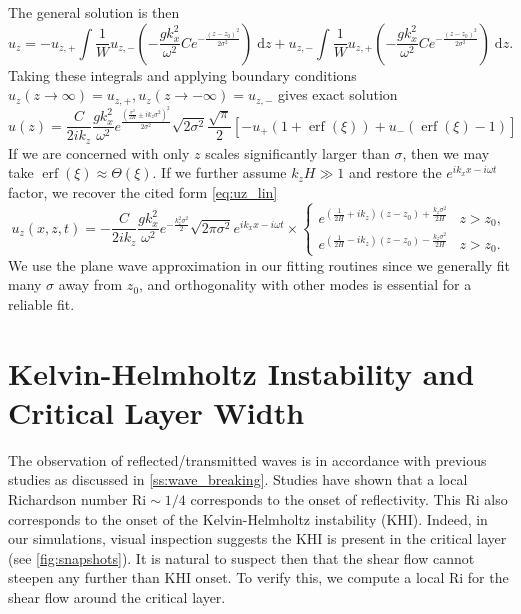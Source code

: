 \documentclass[
        fleqn,
        usenatbib,
        referee,
    ]{mnras}
\newcommand*{\p}[1]{\left(#1\right)}
\newcommand*{\s}[1]{\left[#1\right]}
\DeclareMathOperator*{\erf}{erf}
\begin{document}
The general solution is then
\begin{equation}
    u_z = -u_{z,+}\int \frac{1}{W} u_{z,-} \p{-\frac{gk_x^2}{\omega^2}
            Ce^{-\frac{(z - z_0)^2}{2\sigma^2}}}\;\mathrm{d}z
        + u_{z,-}\int \frac{1}{W} u_{z,+} \p{-\frac{gk_x^2}{\omega^2}
            Ce^{-\frac{(z - z_0)^2}{2\sigma^2}}}\;\mathrm{d}z.
\end{equation}
Taking these integrals and applying boundary conditions $u_z\p{z \to \infty} =
u_{z,+}, u_z\p{z \to -\infty} = u_{z,-}$ gives exact solution
\begin{equation}
    u(z) = \frac{C}{2ik_z}\frac{gk_x^2}{\omega^2}
            e^{\frac{\p{\frac{\sigma^2}{2H} \pm ik_z\sigma^2}^2}{2\sigma^2}}
                \sqrt{2\sigma^2} \frac{\sqrt{\pi}}{2}\s{
                    -u_+\p{1 + \erf\p{\xi}}
                    + u_- \p{\erf\p{\xi} - 1}}
\end{equation}
If we are concerned with only $z$ scales significantly larger than $\sigma$,
then we may take $\erf(\xi) \approx \Theta(\xi)$. If we further assume $k_zH \gg
1$ and restore the $e^{ik_xx - i\omega t}$ factor, we recover the cited form
\autoref{eq:uz_lin}
\begin{equation}
    u_{z}(x, z, t) = -\frac{C}{2ik_z}\frac{gk_x^2}{\omega^2}
        e^{-\frac{k_z^2\sigma^2}{2}}
        \sqrt{2\pi \sigma^2} e^{ik_xx - i\omega t} \times
    \begin{cases}
        e^{\p{\frac{1}{2H} + ik_z}\p{z - z_0} + \frac{k_z\sigma^2}{2H}}
            & z > z_0,\\
        e^{\p{\frac{1}{2H} - ik_z}\p{z - z_0} - \frac{k_z\sigma^2}{2H}}
            & z > z_0.
    \end{cases}
\end{equation}
We use the plane wave approximation in our fitting routines since we generally
fit many $\sigma$ away from $z_0$, and orthogonality with other modes is
essential for a reliable fit.

\section{Kelvin-Helmholtz Instability and Critical Layer Width}\label{s:khi}

The observation of reflected/transmitted waves is in accordance with previous
studies as discussed in \autoref{ss:wave_breaking}. Studies have shown that a
local Richardson number $\mathrm{Ri} \sim 1/4$ corresponds to the onset of
reflectivity. This $\mathrm{Ri}$ also corresponds to the onset of the
Kelvin-Helmholtz instability (KHI). Indeed, in our simulations, visual
inspection suggests the KHI is present in the critical layer (see
\autoref{fig:snapshots}). It is natural to suspect then that the shear flow
cannot steepen any further than KHI onset. To verify this, we compute a local
$\mathrm{Ri}$ for the shear flow around the critical layer.
\end{document}
